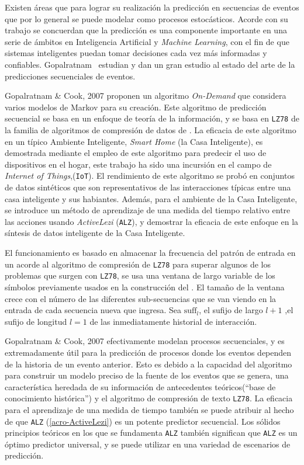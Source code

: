 Existen áreas que para lograr su realización la predicción en secuencias de eventos que por lo general se puede modelar como procesos estocásticos.
Acorde con su trabajo se concuerdan que la predicción es una componente importante en una serie de ámbitos en Inteligencia Artificial y \emph{Machine Learning}, con el fin de que sistemas inteligentes puedan tomar decisiones cada vez más informadas y confiables.  Gopalratnam~\etal\cite{Gopalratnam2007} estudian y dan un gran estudio al estado del arte de la predicciones secuenciales de eventos.

Gopalratnam \& Cook, 2007 \etal\cite{Gopalratnam2007} proponen un algoritmo \emph{On-Demand} que considera varios modelos de Markov para su creación.  Este algoritmo de predicción secuencial se basa en un enfoque de teoría de la información, y se basa en \texttt{LZ78} de la familia de algoritmos de compresión de datos de \lempelziv. La eficacia de este algoritmo en un típico {Ambiente Inteligente}, \emph{Smart Home} (la Casa Inteligente), es demostrada mediante el empleo de este algoritmo para predecir el uso de dispositivos en el hogar, este trabajo ha sido una incursión en el campo de \emph{Internet of Things},(\texttt{IoT}). El rendimiento de este algoritmo se probó en conjuntos de datos sintéticos que son representativos de las interacciones típicas entre una casa inteligente y sus habiantes. Además, para el ambiente de la Casa Inteligente, se introduce un método de aprendizaje de una medida del tiempo relativo entre las acciones usando \emph{ActiveLezi} (\texttt{ALZ})\label{acro-ActiveLezi}, y demostrar la eficacia de este enfoque en la síntesis de datos inteligente de la Casa Inteligente.

El funcionamiento es basado en almacenar la frecuencia del patrón de entrada en un \trie acorde al algoritmo de compresión de \texttt{LZ78} para superar algunos de los problemas que surgen con \texttt{LZ78}, se usa una ventana de largo variable de los símbolos previamente usados en la construcción del \trie. El tamaño de la ventana crece con el número de las diferentes sub-secuencias que se van viendo en la entrada de cada secuencia nueva que ingresa.  Sea $\mbox{suff} _{l} $,  el sufijo de largo $l+1$ ,el sufijo de longitud $l=1$ de las inmediatamente historial de interacción.%

Gopalratnam \& Cook, 2007 \etal\cite{Gopalratnam2007} efectivamente modelan procesos secuenciales, y es extremadamente útil para la predicción de procesos donde los eventos dependen de la historia de un evento anterior. Esto es debido a la capacidad del algoritmo para construir un modelo preciso de la fuente de los eventos que se genera, una característica heredada de su información de antecedentes teóricos(``base de conocimiento histórica'') y el algoritmo de compresión de texto \texttt{LZ78}. La eficacia para el aprendizaje de una medida de tiempo también se puede atribuir al hecho de que \texttt{ALZ} (\ref{acro-ActiveLezi}) es un potente predictor secuencial. Los sólidos principios teóricos en los que se fundamenta \texttt{ALZ} también significan que \texttt{ALZ} es un óptimo predictor universal, y se puede utilizar en una variedad de escenarios de predicción.
	
  	
  	  